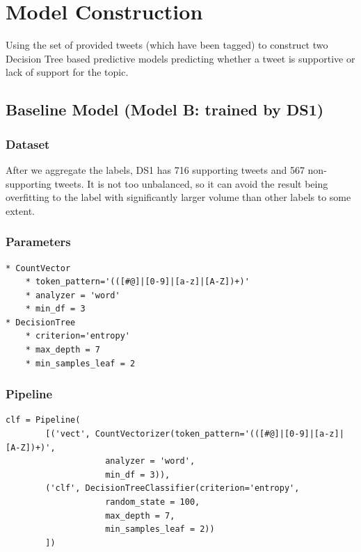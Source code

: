 \documentclass{article} %
\begin{document}
\section{Model Construction}

Using the set of provided tweets (which have been tagged) to construct two Decision Tree based predictive models predicting whether a tweet is supportive or lack of support for the topic.

\subsection{Baseline Model (Model B: trained by DS1)}

\subsubsection{Dataset}
After we aggregate the labels, DS1 has 716 supporting tweets and 567 non-supporting tweets. It is not too unbalanced, so it can avoid the result being overfitting to the label with significantly larger volume than other labels to some extent.


\subsubsection{Parameters}

\lstset{language=Python}
\lstset{showstringspaces=false}
\lstset{frame=lines}
\lstset{basicstyle=\footnotesize}
\begin{lstlisting}
* CountVector
	* token_pattern='(([#@]|[0-9]|[a-z]|[A-Z])+)'
	* analyzer = 'word'
	* min_df = 3
* DecisionTree
	* criterion='entropy'
	* max_depth = 7
	* min_samples_leaf = 2
\end{lstlisting}


\subsubsection{Pipeline}

\lstset{language=Python}
\lstset{frame=lines}
\lstset{basicstyle=\footnotesize}
\begin{lstlisting}
clf = Pipeline(
		[('vect', CountVectorizer(token_pattern='(([#@]|[0-9]|[a-z]|[A-Z])+)',
					analyzer = 'word',
					min_df = 3)),
		('clf', DecisionTreeClassifier(criterion='entropy',
					random_state = 100,
					max_depth = 7,
					min_samples_leaf = 2))
		])
\end{lstlisting}
\end{document}
